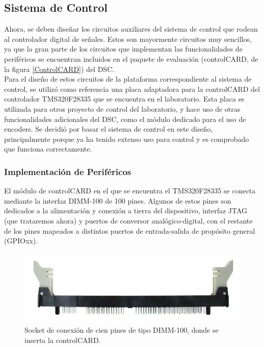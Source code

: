 \subsection{Sistema de Control}

Ahora, se deben diseñar los circuitos auxiliares del sistema de control que rodean al controlador digital de señales. Estos son mayormente circuitos muy sencillos, ya que la gran parte de los circuitos que implementan las funcionalidades de periféricos se encuentran incluidos en el paquete de evaluación (controlCARD, de la figura \ref{ControlCARD}) del DSC.\\

Para el diseño de estos circuitos de la plataforma correspondiente al sistema de control, se utilizó como referencia una placa adaptadora para la controlCARD del controlador TMS320F28335 que se encuentra en el laboratorio. Esta placa es utilizada para otros proyecto de control del laboratorio, y hace uso de otras funcionalidades adicionales del DSC, como el módulo dedicado para el uso de encoders. Se decidió por basar el sistema de control en este diseño, principalmente porque ya ha tenido extenso uso para control y es comprobado que funciona correctamente.\\

\subsubsection{Implementación de Periféricos}

El módulo de controlCARD en el que se encuentra el TMS320F28335 se conecta mediante la interfaz DIMM-100 de 100 pines. Algunos de estos pines son dedicados a la alimentación y conexión a tierra del dispositivo, interfaz JTAG (que trataremos ahora) y puertos de conversor analógico-digital, con el restante de los pines mapeados a distintos puertos de entrada-salida de propósito general (GPIOxx).\\

\begin{figure}[h]
    \centering
    \includegraphics[scale=0.5]{Imagenes/DIMM100.png}
    \caption{Socket de conexión de cien pines de tipo DIMM-100, donde se inserta la controlCARD.}
    \label{dimm100}
\end{figure}

